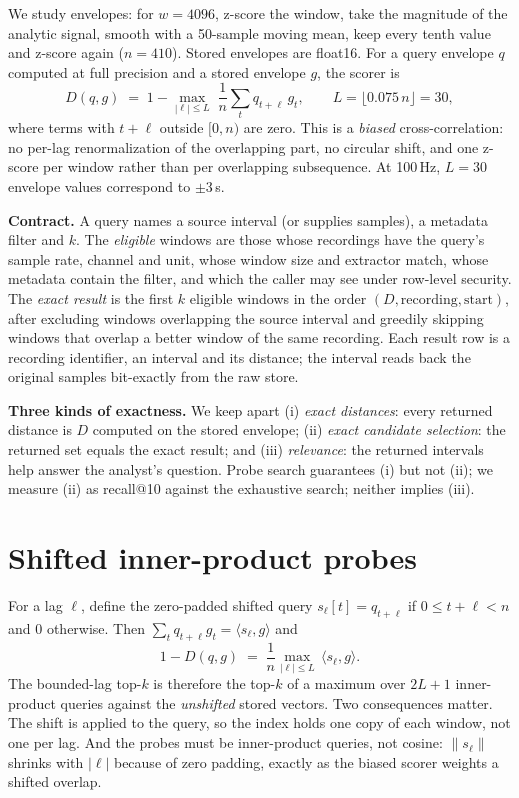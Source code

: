 \documentclass[sigconf]{acmart}
\begin{document}
We study envelopes: for $w=4096$, z-score the window, take the magnitude of the analytic signal, smooth with a 50-sample moving mean, keep every tenth value and z-score again ($n=410$). Stored envelopes are float16. For a query envelope $q$ computed at full precision and a stored envelope $g$, the scorer is
\begin{equation}\label{eq:d}
D(q,g) \;=\; 1-\max_{|\ell|\le L}\;\frac{1}{n}\sum_{t} q_{t+\ell}\,g_t ,\qquad L=\lfloor 0.075\,n\rfloor=30,
\end{equation}
where terms with $t+\ell$ outside $[0,n)$ are zero. This is a \emph{biased} cross-correlation: no per-lag renormalization of the overlapping part, no circular shift, and one z-score per window rather than per overlapping subsequence. At 100\,Hz, $L=30$ envelope values correspond to $\pm3$\,s.

\textbf{Contract.} A query names a source interval (or supplies samples), a metadata filter and $k$. The \emph{eligible} windows are those whose recordings have the query's sample rate, channel and unit, whose window size and extractor match, whose metadata contain the filter, and which the caller may see under row-level security. The \emph{exact result} is the first $k$ eligible windows in the order $(D,\text{recording},\text{start})$, after excluding windows overlapping the source interval and greedily skipping windows that overlap a better window of the same recording. Each result row is a recording identifier, an interval and its distance; the interval reads back the original samples bit-exactly from the raw store.

\textbf{Three kinds of exactness.} We keep apart (i) \emph{exact distances}: every returned distance is $D$ computed on the stored envelope; (ii) \emph{exact candidate selection}: the returned set equals the exact result; and (iii) \emph{relevance}: the returned intervals help answer the analyst's question. Probe search guarantees (i) but not (ii); we measure (ii) as recall@10 against the exhaustive search; neither implies (iii).

\section{Shifted inner-product probes}\label{sec:method}
For a lag $\ell$, define the zero-padded shifted query $s_\ell[t]=q_{t+\ell}$ if $0\le t+\ell<n$ and $0$ otherwise. Then $\sum_t q_{t+\ell}g_t=\langle s_\ell,g\rangle$ and
\begin{equation}\label{eq:probe}
1-D(q,g)\;=\;\frac{1}{n}\max_{|\ell|\le L}\,\langle s_\ell,g\rangle .
\end{equation}
The bounded-lag top-$k$ is therefore the top-$k$ of a maximum over $2L{+}1$ inner-product queries against the \emph{unshifted} stored vectors. Two consequences matter. The shift is applied to the query, so the index holds one copy of each window, not one per lag. And the probes must be inner-product queries, not cosine: $\|s_\ell\|$ shrinks with $|\ell|$ because of zero padding, exactly as the biased scorer weights a shifted overlap.
\end{document}
